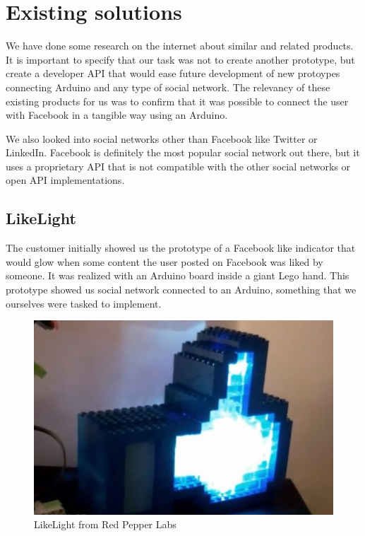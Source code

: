 \section{Existing solutions}
We have done some research on the internet about similar and related products.  It is important to specify that our task
was not to create another prototype, but create a  developer API that would ease future development of new protoypes 
connecting Arduino and any type of social network. The relevancy of these existing products for us was to confirm that it 
was possible to connect the user with Facebook in a tangible way using an Arduino.

We also looked into social networks other than Facebook like Twitter or LinkedIn. Facebook is definitely the 
most popular social network out there, but it uses a proprietary API that is not compatible with the other social 
networks or open API implementations.

\subsection{LikeLight}
The customer initially showed us the prototype of a Facebook like indicator that would glow when some content the
 user posted on Facebook was liked by someone. It was realized with an Arduino board inside a giant Lego hand. 
This prototype showed us social network connected to an Arduino, something that we ourselves were tasked to 
implement.

\begin{figure}[h!]
\centering \includegraphics[scale=0.85]{img/prestudies-likehand} \caption{LikeLight from Red Pepper Labs}

\label{fig:prestudies-likehand}
\end{figure}

